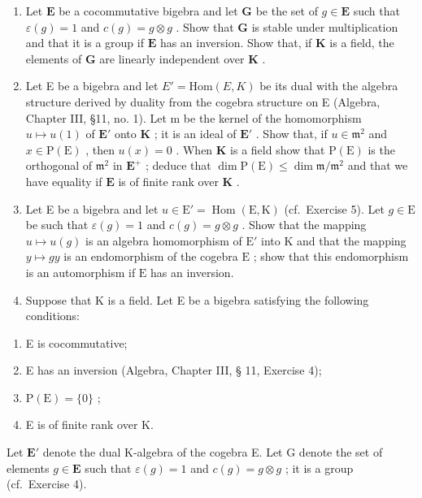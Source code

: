 \begin{enumerate}
\def\labelenumi{\arabic{enumi}.}
\setcounter{enumi}{3}
\item
  Let \(\mathbf{E}\) be a cocommutative bigebra and let \(\mathbf{G}\) be the set of \(g \in \mathbf{E}\) such that \(\varepsilon(g) = 1\) and \(c(g) = g \otimes g\) . Show that \(\mathbf{G}\) is stable under multiplication and that it is a group if \(\mathbf{E}\) has an inversion. Show that, if \(\mathbf{K}\) is a field, the elements of \(\mathbf{G}\) are linearly independent over \(\mathbf{K}\) .
\item
  Let E be a bigebra and let \(E' = \text{Hom}(E, K)\) be its dual with the algebra structure derived by duality from the cogebra structure on E (Algebra, Chapter III, §11, no. 1). Let m be the kernel of the homomorphism \(u \mapsto u(1)\) of \(\mathbf{E}'\) onto \(\mathbf{K}\) ; it is an ideal of \(\mathbf{E}'\) . Show that, if \(u \in \mathfrak{m}^2\) and \(x \in \mathrm{P}(\mathrm{E})\) , then \(u(x) = 0\) . When \(\mathbf{K}\) is a field show that \(\mathrm{P}(\mathrm{E})\) is the orthogonal of \(\mathfrak{m}^2\) in \(\mathbf{E}^+\) ; deduce that \(\dim \mathrm{P}(\mathrm{E}) \leqslant \dim \mathfrak{m} / \mathfrak{m}^2\) and that we have equality if \(\mathbf{E}\) is of finite rank over \(\mathbf{K}\) .
\item
  Let E be a bigebra and let \(u \in \mathrm{E}' = \operatorname{Hom}(\mathrm{E}, \mathrm{K})\) (cf.~Exercise 5). Let \(g \in \mathrm{E}\) be such that \(\varepsilon(g) = 1\) and \(c(g) = g \otimes g\) . Show that the mapping \(u \mapsto u(g)\) is an algebra homomorphism of \(\mathrm{E}'\) into \(\mathrm{K}\) and that the mapping \(y \mapsto gy\) is an endomorphism of the cogebra \(\mathrm{E}\) ; show that this endomorphism is an automorphism if \(\mathrm{E}\) has an inversion.
\item
  Suppose that K is a field. Let E be a bigebra satisfying the following conditions:
\end{enumerate}

\begin{enumerate}
\def\labelenumi{(\roman{enumi})}
\item
  E is cocommutative;
\item
  E has an inversion (Algebra, Chapter III, § 11, Exercise 4);
\item
  \(\mathrm{P(E)} = \{0\}\) ;
\item
  E is of finite rank over K.
\end{enumerate}

Let \(\mathbf{E}'\) denote the dual K-algebra of the cogebra E. Let G denote the set of elements \(g \in \mathbf{E}\) such that \(\varepsilon(g) = 1\) and \(c(g) = g \otimes g\) ; it is a group (cf.~Exercise 4).

